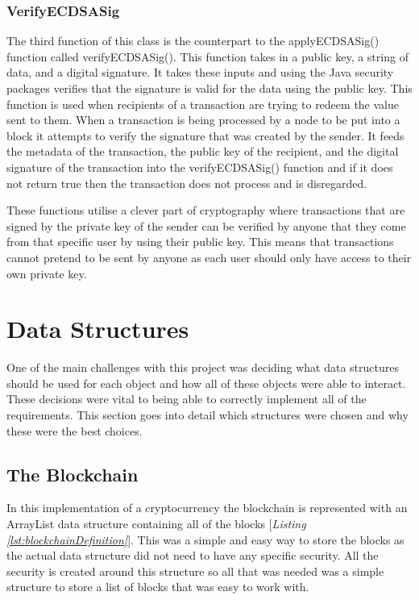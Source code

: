 \documentclass{l4proj}
\begin{document}
\subsubsection{VerifyECDSASig}
The third function of this class is the counterpart to the applyECDSASig() function called verifyECDSASig(). This 
function takes in a public key, a string of data, and a digital signature. It takes these inputs and using the Java
security packages verifies that the signature is valid for the data using the public key. This function is used
when recipients of a transaction are trying to redeem the value sent to them. When a transaction is being processed
by a node to be put into a block it attempts to verify the signature that was created by the sender. It feeds the metadata
of the transaction, the public key of the recipient, and the digital signature of the transaction into the verifyECDSASig()
function and if it does not return true then the transaction does not process and is disregarded.

These functions utilise a clever part of cryptography where transactions that are signed by the private key of the
sender can be verified by anyone that they come from that specific user by using their public key. This means that 
transactions cannot pretend to be sent by anyone as each user should only have access to their own private key.

\section{Data Structures}
One of the main challenges with this project was deciding what data structures should be used for each object and
how all of these objects were able to interact. These decisions were vital to being able to correctly implement
all of the requirements. This section goes into detail which structures were chosen and why these were the best
choices.

\subsection{The Blockchain}
In this implementation of a cryptocurrency the blockchain is represented with an ArrayList data structure containing
all of the blocks [\textit{Listing \ref{lst:blockchainDefinition}}]. This was a simple and easy way to store the blocks as the actual data structure did not need to
have any specific security. All the security is created around this structure so all that was needed was a simple 
structure to store a list of blocks that was easy to work with. 
\end{document}
